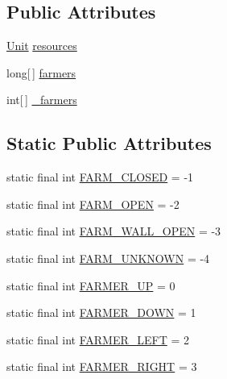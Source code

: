 \subsection*{Public Attributes}
\begin{DoxyCompactItemize}
\item 
\hyperlink{classrts_1_1units_1_1_unit}{Unit} \hyperlink{classai_1_1general_1_1_general_a_i_farm_a6461ff6cb7c7555aba9d283a957138ce}{resources}
\item 
long\mbox{[}$\,$\mbox{]} \hyperlink{classai_1_1general_1_1_general_a_i_farm_ac364667b05485e9002f5d626eea25236}{farmers}
\item 
int\mbox{[}$\,$\mbox{]} \hyperlink{classai_1_1general_1_1_general_a_i_farm_a4bdcfb5af83a86be179a4c10b9a8a597}{\_\-farmers}
\end{DoxyCompactItemize}
\subsection*{Static Public Attributes}
\begin{DoxyCompactItemize}
\item 
static final int \hyperlink{classai_1_1general_1_1_general_a_i_farm_ae53454364afab495bdbc9870b54b7e4e}{FARM\_\-CLOSED} = -\/1
\item 
static final int \hyperlink{classai_1_1general_1_1_general_a_i_farm_a7b7770da22903858892e7f63d32a6657}{FARM\_\-OPEN} = -\/2
\item 
static final int \hyperlink{classai_1_1general_1_1_general_a_i_farm_a9235a0a0538a426043d785a00a3d4345}{FARM\_\-WALL\_\-OPEN} = -\/3
\item 
static final int \hyperlink{classai_1_1general_1_1_general_a_i_farm_aed2adecb0cce6a9a2fa0806c8fa11af5}{FARM\_\-UNKNOWN} = -\/4
\item 
static final int \hyperlink{classai_1_1general_1_1_general_a_i_farm_a6f7e0293a23d11a27bfc7aad449e1c2f}{FARMER\_\-UP} = 0
\item 
static final int \hyperlink{classai_1_1general_1_1_general_a_i_farm_a8c4ee9d0755408d23fc4a2e3ce9a1dc1}{FARMER\_\-DOWN} = 1
\item 
static final int \hyperlink{classai_1_1general_1_1_general_a_i_farm_af6c22fd003a4d97d93022ab3d1ceb2ea}{FARMER\_\-LEFT} = 2
\item 
static final int \hyperlink{classai_1_1general_1_1_general_a_i_farm_ad3a3956aee09fbbc3f1f471914ce9f9d}{FARMER\_\-RIGHT} = 3
\end{DoxyCompactItemize}
